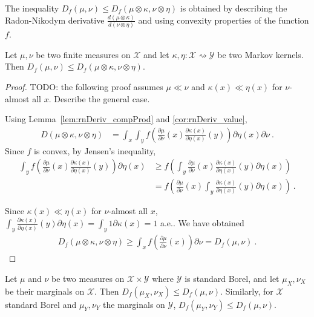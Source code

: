 The inequality $D_f(\mu, \nu) \le D_f(\mu \otimes \kappa, \nu \otimes \eta)$ is obtained by describing the Radon-Nikodym derivative $\frac{d(\mu \otimes \kappa)}{d(\nu \otimes \eta)}$ and using convexity properties of the function $f$.

\begin{theorem}
  \label{thm:fDiv_le_compProd_1}
  \leanok
  Let $\mu, \nu$ be two finite measures on $\mathcal X$ and let $\kappa, \eta : \mathcal X \rightsquigarrow \mathcal Y$ be two Markov kernels.
  Then $D_f(\mu, \nu) \le D_f(\mu \otimes \kappa, \nu \otimes \eta)$.
\end{theorem}

\begin{proof}\leanok
{}
TODO: the following proof assumes $\mu \ll \nu$ and $\kappa(x) \ll \eta(x)$ for $\nu$-almost all $x$. Describe the general case.

Using Lemma~\ref{lem:rnDeriv_compProd} and \ref{cor:rnDeriv_value},
\begin{align*}
D(\mu \otimes \kappa, \nu \otimes \eta)
&= \int_x \int_y f \left( \frac{\partial \mu}{\partial\nu}(x) \frac{\partial \kappa(x)}{\partial\eta(x)}(y) \right) \partial \eta(x) \partial \nu
\: .
\end{align*}
Since $f$ is convex, by Jensen's inequality,
\begin{align*}
\int_y f \left( \frac{\partial \mu}{\partial\nu}(x) \frac{\partial \kappa(x)}{\partial\eta(x)}(y) \right) \partial \eta(x)
&\ge f \left( \int_y \frac{\partial \mu}{\partial\nu}(x) \frac{\partial \kappa(x)}{\partial\eta(x)}(y) \partial \eta(x) \right)
\\
&= f \left( \frac{\partial \mu}{\partial\nu}(x) \int_y \frac{\partial \kappa(x)}{\partial\eta(x)}(y) \partial \eta(x) \right)
\: .
\end{align*}

Since $\kappa(x) \ll \eta(x)$ for $\nu$-almost all $x$, $\int_y \frac{\partial \kappa(x)}{\partial\eta(x)}(y) \partial \eta(x) = \int_y 1 \partial \kappa(x) = 1$ a.e.. We have obtained
\begin{align*}
D_f(\mu \otimes \kappa, \nu \otimes \eta)
\ge \int_x f \left( \frac{\partial \mu}{\partial\nu}(x)\right) \partial \nu
= D_f(\mu, \nu)
\: .
\end{align*}
\end{proof}

\begin{theorem}[Marginals]
  \label{thm:fDiv_fst_le_1}
  \leanok
  Let $\mu$ and $\nu$ be two measures on $\mathcal X \times \mathcal Y$ where $\mathcal Y$ is standard Borel, and let $\mu_X, \nu_X$ be their marginals on $\mathcal X$.
  Then $D_f(\mu_X, \nu_X) \le D_f(\mu, \nu)$.
  Similarly, for $\mathcal X$ standard Borel and $\mu_Y, \nu_Y$ the marginals on $\mathcal Y$, $D_f(\mu_Y, \nu_Y) \le D_f(\mu, \nu)$.
\end{theorem}

